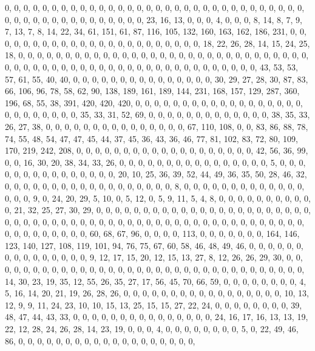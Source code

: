 \documentclass[
]{article}
\begin{document}
0, 0, 0, 0, 0, 0, 0, 0, 0, 0, 0, 0, 0, 0, 0, 0, 0, 0, 0, 0, 0, 0, 0, 0,
0, 0, 0, 0, 0, 0, 0, 0, 0, 0, 0, 0, 0, 0, 0, 0, 0, 0, 0, 0, 0, 0, 0, 23,
16, 13, 0, 0, 0, 4, 0, 0, 0, 8, 14, 8, 7, 9, 7, 13, 7, 8, 14, 22, 34,
61, 151, 61, 87, 116, 105, 132, 160, 163, 162, 186, 231, 0, 0, 0, 0, 0,
0, 0, 0, 0, 0, 0, 0, 0, 0, 0, 0, 0, 0, 0, 0, 0, 0, 0, 18, 22, 26, 28,
14, 15, 24, 25, 18, 0, 0, 0, 0, 0, 0, 0, 0, 0, 0, 0, 0, 0, 0, 0, 0, 0,
0, 0, 0, 0, 0, 0, 0, 0, 0, 0, 0, 0, 0, 0, 0, 0, 0, 0, 0, 0, 0, 0, 0, 0,
0, 0, 0, 0, 0, 0, 0, 0, 0, 0, 0, 0, 0, 0, 0, 0, 0, 43, 53, 53, 57, 61,
55, 40, 40, 0, 0, 0, 0, 0, 0, 0, 0, 0, 0, 0, 0, 0, 0, 0, 30, 29, 27, 28,
30, 87, 83, 66, 106, 96, 78, 58, 62, 90, 138, 189, 161, 189, 144, 231,
168, 157, 129, 287, 360, 196, 68, 55, 38, 391, 420, 420, 420, 0, 0, 0,
0, 0, 0, 0, 0, 0, 0, 0, 0, 0, 0, 0, 0, 0, 0, 0, 0, 0, 0, 0, 0, 0, 0, 35,
33, 31, 52, 69, 0, 0, 0, 0, 0, 0, 0, 0, 0, 0, 0, 0, 0, 38, 35, 33, 26,
27, 38, 0, 0, 0, 0, 0, 0, 0, 0, 0, 0, 0, 0, 0, 0, 0, 67, 110, 108, 0, 0,
83, 86, 88, 78, 74, 55, 48, 54, 47, 47, 45, 44, 37, 45, 36, 43, 36, 46,
77, 81, 102, 83, 72, 80, 109, 170, 219, 242, 208, 0, 0, 0, 0, 0, 0, 0,
0, 0, 0, 0, 0, 0, 0, 0, 0, 0, 0, 0, 42, 56, 36, 99, 0, 0, 16, 30, 20,
38, 34, 33, 26, 0, 0, 0, 0, 0, 0, 0, 0, 0, 0, 0, 0, 0, 0, 0, 0, 5, 0, 0,
0, 0, 0, 0, 0, 0, 0, 0, 0, 0, 0, 0, 0, 20, 10, 25, 36, 39, 52, 44, 49,
36, 35, 50, 28, 46, 32, 0, 0, 0, 0, 0, 0, 0, 0, 0, 0, 0, 0, 0, 0, 0, 0,
0, 0, 8, 0, 0, 0, 0, 0, 0, 0, 0, 0, 0, 0, 0, 0, 0, 0, 0, 9, 0, 24, 20,
29, 5, 10, 0, 5, 12, 0, 5, 9, 11, 5, 4, 8, 0, 0, 0, 0, 0, 0, 0, 0, 0, 0,
0, 21, 32, 25, 27, 30, 29, 0, 0, 0, 0, 0, 0, 0, 0, 0, 0, 0, 0, 0, 0, 0,
0, 0, 0, 0, 0, 0, 0, 0, 0, 0, 0, 0, 0, 0, 0, 0, 0, 0, 0, 0, 0, 0, 0, 0,
0, 0, 0, 0, 0, 0, 0, 0, 0, 0, 0, 0, 0, 0, 0, 0, 0, 0, 0, 0, 0, 0, 0, 0,
0, 60, 68, 67, 96, 0, 0, 0, 0, 113, 0, 0, 0, 0, 0, 0, 0, 164, 146, 123,
140, 127, 108, 119, 101, 94, 76, 75, 67, 60, 58, 46, 48, 49, 46, 0, 0,
0, 0, 0, 0, 0, 0, 0, 0, 0, 0, 0, 0, 0, 9, 12, 17, 15, 20, 12, 15, 13,
27, 8, 12, 26, 26, 29, 30, 0, 0, 0, 0, 0, 0, 0, 0, 0, 0, 0, 0, 0, 0, 0,
0, 0, 0, 0, 0, 0, 0, 0, 0, 0, 0, 0, 0, 0, 0, 0, 0, 0, 0, 14, 30, 23, 19,
35, 12, 55, 26, 35, 27, 17, 56, 45, 70, 66, 59, 0, 0, 0, 0, 0, 0, 0, 0,
4, 5, 16, 14, 20, 21, 19, 26, 28, 26, 0, 0, 0, 0, 0, 0, 0, 0, 0, 0, 0,
0, 0, 0, 0, 0, 0, 10, 13, 12, 9, 9, 11, 24, 23, 10, 10, 15, 13, 25, 15,
15, 27, 22, 24, 0, 0, 0, 0, 0, 0, 0, 0, 39, 48, 47, 44, 43, 33, 0, 0, 0,
0, 0, 0, 0, 0, 0, 0, 0, 0, 0, 0, 0, 24, 16, 17, 16, 13, 13, 19, 22, 12,
28, 24, 26, 28, 14, 23, 19, 0, 0, 0, 4, 0, 0, 0, 0, 0, 0, 0, 0, 5, 0,
22, 49, 46, 86, 0, 0, 0, 0, 0, 0, 0, 0, 0, 0, 0, 0, 0, 0, 0, 0, 0, 0, 0,
\end{document}

